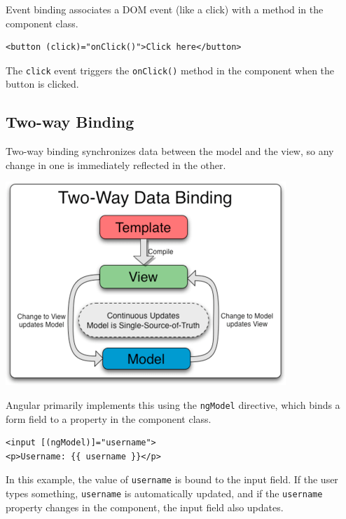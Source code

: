 \documentclass{article}
\begin{document}
Event binding associates a DOM event (like a click) with a method in the component class.
\begin{verbatim}
<button (click)="onClick()">Click here</button>
\end{verbatim}
The \texttt{click} event triggers the \texttt{onClick()} method in the component when the button is clicked.

\subsection{Two-way Binding}

Two-way binding synchronizes data between the model and the view, so any change in one is immediately reflected in the other.
\begin{tcolorbox}[colframe=black!70, colback=white, title=Figure 6: Two-way Data Binding, fonttitle=\bfseries]
\centering
\includegraphics[width=\textwidth]{images/angularjs-two-way-data-binding.png}
\end{tcolorbox}

Angular primarily implements this using the \texttt{ngModel} directive, which binds a form field to a property in the component class.

\begin{verbatim}
<input [(ngModel)]="username">
<p>Username: {{ username }}</p>
\end{verbatim}

In this example, the value of \texttt{username} is bound to the input field. If the user types something, \texttt{username} is automatically updated, and if the \texttt{username} property changes in the component, the input field also updates.
\end{document}
